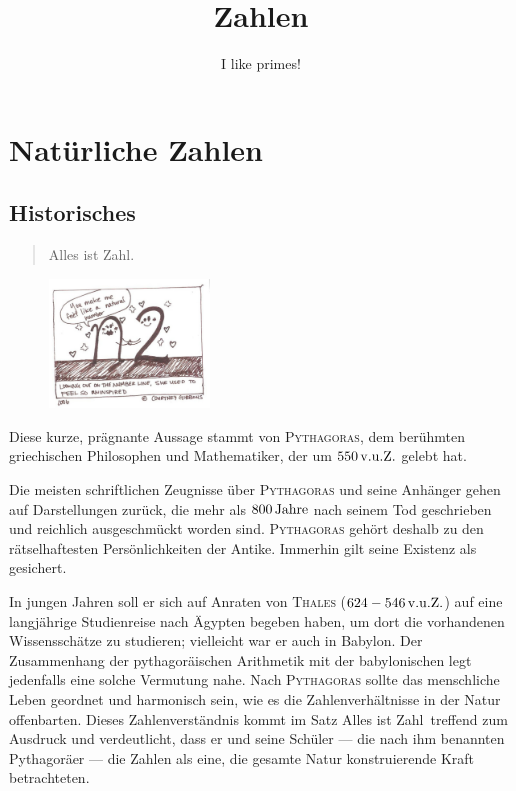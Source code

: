 \documentclass[%
11pt,%
twoside,%
titlepage,%
german,%
headsepline%
]{scrartcl}
\title{Zahlen}
\subtitle{I like primes!}
\author{}
\date{}
\begin{document}
\maketitle
\tableofcontents
\cleardoublepage

\section{Natürliche Zahlen}
\subsection{Historisches}
\begin{quote}
Alles ist Zahl.
\end{quote}

\begin{figure}
\vspace{-22pt}
  \begin{center}
    \includegraphics[width=0.38\textwidth]{pictures/zahln}
  \end{center}
\vspace{-22pt}
\end{figure}
Diese kurze, prägnante Aussage stammt von \textsc{Pythagoras}, dem berühmten griechischen Philosophen und Mathematiker, der um $\unit[550]{v.u.Z.}$ gelebt hat.

Die meisten schriftlichen Zeugnisse über \textsc{Pythagoras} und seine Anhänger gehen auf Darstellungen zurück, die mehr als $\unit[800]{Jahre}$ nach seinem Tod geschrieben und reichlich ausgeschmückt worden sind. \textsc{Pythagoras} gehört deshalb zu den rätselhaftesten Persönlichkeiten der Antike. Immerhin gilt seine Existenz als gesichert.

In jungen Jahren soll er sich auf Anraten von \textsc{Thales} ($\unit[624-546]{v.u.Z.}$) auf eine langjährige Studienreise nach Ägypten begeben haben, um dort die vorhandenen Wissensschätze zu studieren; vielleicht war er auch in Babylon. Der Zusammenhang der pythagoräischen Arithmetik mit der babylonischen legt jedenfalls eine solche Vermutung nahe. Nach \textsc{Pythagoras} sollte das menschliche Leben geordnet und harmonisch sein, wie es die Zahlenverhältnisse in der Natur offenbarten. Dieses Zahlenverständnis kommt im Satz \glqq Alles ist Zahl\grqq\ treffend zum Ausdruck und verdeutlicht, dass er und seine Schüler --- die nach ihm benannten Pythagoräer --- die Zahlen als eine, die gesamte Natur konstruierende Kraft betrachteten.
\end{document}
